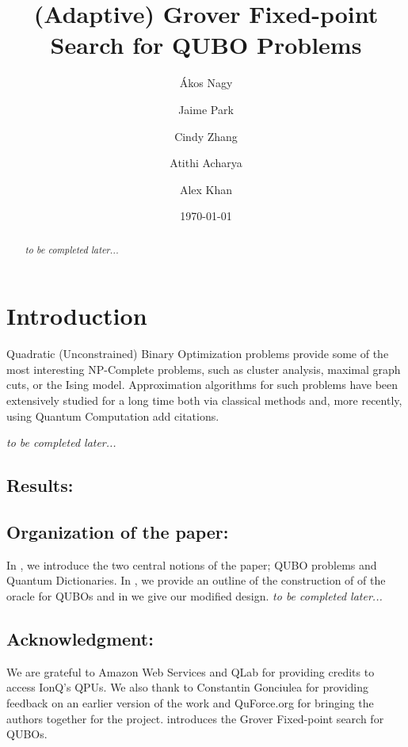 \documentclass[reqno, 10pt]{amsart}
\title{(Adaptive) Grover Fixed-point Search for QUBO Problems}
\date{\today}
\author{\'Akos Nagy}
\author{Jaime Park}
\author{Cindy Zhang}
\author{Atithi Acharya}
\author{Alex Khan}
\numberwithin{equation}{section}                %
\begin{document}
\begin{abstract}
   \emph{to be completed later...}
\end{abstract}

\maketitle

\section{Introduction}

Quadratic (Unconstrained) Binary Optimization problems provide some of the most interesting NP-Complete problems, such as cluster analysis, maximal graph cuts, or the Ising model. Approximation algorithms for such problems have been extensively studied for a long time both via classical methods and, more recently, using Quantum Computation {\color{red} add citations}.

\emph{to be completed later...}

\medskip

\subsection{Results:}

\smallskip

\subsection*{Organization of the paper:} In , we introduce the two central notions of the paper; QUBO problems and Quantum Dictionaries. In , we provide an outline of the construction of \cite{gilliam_grover_2021} of the oracle for QUBOs and in  we give our modified design. \emph{to be completed later...}

\smallskip

\subsection*{Acknowledgment:} We are grateful to Amazon Web Services and QLab for providing credits to access IonQ's QPUs. We also thank to Constantin Gonciulea for providing feedback on an earlier version of the work and QuForce.org for bringing the authors together for the project.  introduces the Grover Fixed-point search for QUBOs.
\end{document}
